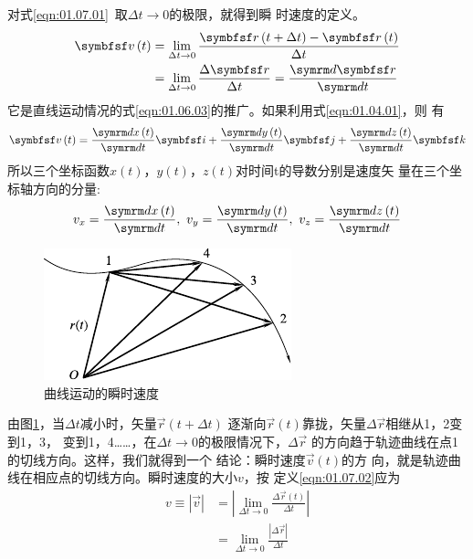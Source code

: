 对式\eqref{eqn:01.07.01}~取$\Delta t \rightarrow 0$的极限，就得到瞬
时速度的定义。
\begin{equation}\label{eqn:01.07.02}
  \begin{aligned}
    \vec{v}\left(t\right) & =\lim _{\Delta t \rightarrow 0} \frac{\vec{r}\left(t+\Delta t\right)-\vec{r}\left(t\right)}{\Delta t} \\
                          & =\lim _{\Delta t \rightarrow 0} \frac{\Delta \vec{r}}{\Delta t} =\frac{\dif\vec{r}}{\dif t}
  \end{aligned}
\end{equation}
它是直线运动情况的式\eqref{eqn:01.06.03}的推广。如果利用式\eqref{eqn:01.04.01}，则
有
\begin{equation}\label{eqn:01.07.03}
  \vec{v}\left(t\right)=\frac{\dif x\left(t\right)}{\dif t} \vec{i}+\frac{\dif y\left(t\right)}{\dif t} \vec{j}+\frac{\dif z\left(t\right)}{\dif t} \vec{k}
\end{equation}
所以三个坐标函数$x\left(t\right)$，$y\left(t\right)$，$z\left(t\right)$对时间t的导数分别是速度矢
量在三个坐标轴方向的分量:
\begin{equation}\label{eqn:01.07.04}
  v_{x}=\frac{\dif x\left(t\right)}{\dif t}, ~ v_{y}=\frac{\dif y\left(t\right)}{\dif t}, ~ v_{z}=\frac{\dif z\left(t\right)}{\dif t}
\end{equation}
\clearpage
\begin{figure}
  \centering
  \small
  \includegraphics{figure/fig01.12}
  \caption{曲线运动的瞬时速度}
  \label{fig:01.12}
\end{figure}
由图\ref{fig:01.12}，当$\Delta t$减小时，矢量$\vec{r}\left(t+\Delta t\right)$
逐渐向$\vec{r}\left(t\right)$靠拢，矢量$\Delta \vec{r}$相继从1，2变到1，3，
变到1，4……，在$\Delta t \rightarrow 0$的极限情况下，$\Delta \vec{r}$
的方向趋于轨迹曲线在点1的切线方向。这样，我们就得到一个
结论：瞬时速度$\vec{v}\left(t\right)$的方
向，就是轨迹曲线在相应点的切线方向。瞬时速度的大小$v$，按
定义\eqref{eqn:01.07.02}应为
\setlength{\mathindent}{15em}
\begin{equation*}
  \begin{aligned}
    v\equiv |\vec{v}| & =\left|\lim _{\Delta t \rightarrow 0} \frac{\Delta \vec{r}\left(t\right)}{\Delta t}\right| \\
                      & =\lim _{\Delta t \rightarrow 0} \frac{|\Delta \vec{r}|}{\Delta t}
  \end{aligned}
\end{equation*}

